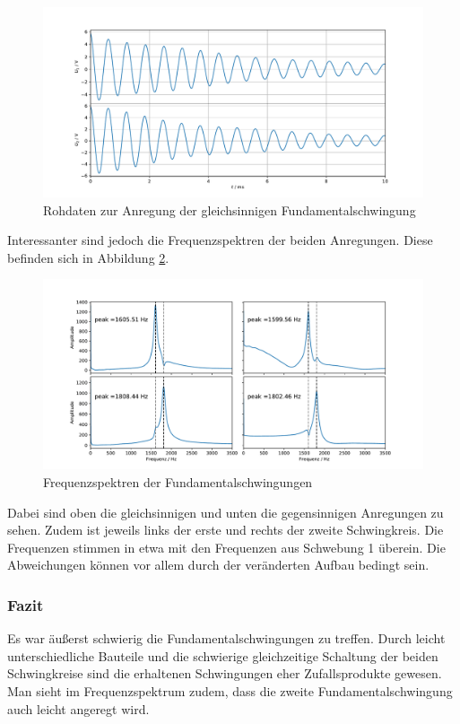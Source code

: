 \begin{figure}[H]
\centering
\includegraphics[width=\textwidth]{plots/fundamental_roh.pdf}
\caption{Rohdaten zur Anregung der gleichsinnigen Fundamentalschwingung}
\label{abb:fundamental_roh}
\end{figure}

Interessanter sind jedoch die Frequenzspektren der beiden Anregungen. Diese befinden sich in Abbildung \ref{abb:FFT_fundamental}.

\begin{figure}[H]
\centering
\includegraphics[width=\textwidth]{plots/fundamental_fft.pdf}
\caption{Frequenzspektren der Fundamentalschwingungen}
\label{abb:FFT_fundamental}
\end{figure}

Dabei sind oben die gleichsinnigen und unten die gegensinnigen Anregungen zu sehen. Zudem ist jeweils links der erste und rechts der zweite Schwingkreis. Die Frequenzen stimmen in etwa mit den Frequenzen aus Schwebung 1 überein. Die Abweichungen können vor allem durch der veränderten Aufbau bedingt sein.

\subsubsection{Fazit}

Es war äußerst schwierig die Fundamentalschwingungen zu treffen. Durch leicht unterschiedliche Bauteile und die schwierige gleichzeitige Schaltung der beiden Schwingkreise sind die erhaltenen Schwingungen eher Zufallsprodukte gewesen. Man sieht im Frequenzspektrum zudem, dass die zweite Fundamentalschwingung auch leicht angeregt wird.